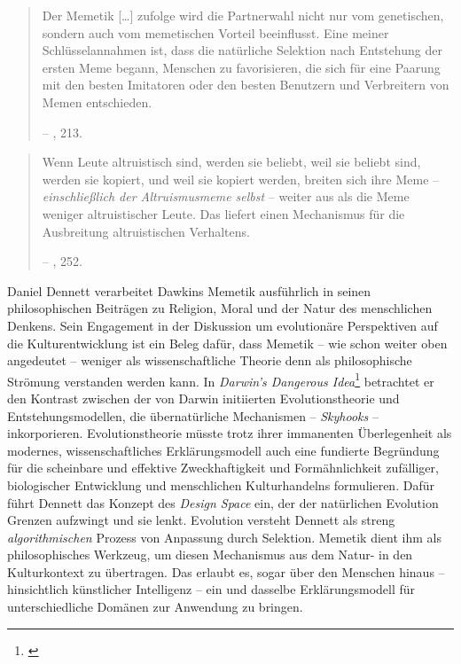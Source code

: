 \documentclass[openany,twoside,twocolumn]{book}
\let\rmarkdownfootnote\footnote%
\def\footnote{\protect\rmarkdownfootnote}
\begin{document}
\begin{quote}
Der Memetik {[}\ldots{}{]} zufolge wird die Partnerwahl nicht nur vom genetischen, sondern auch vom memetischen Vorteil beeinflusst. Eine meiner Schlüsselannahmen ist, dass die natürliche Selektion nach Entstehung der ersten Meme begann, Menschen zu favorisieren, die sich für eine Paarung mit den besten Imitatoren oder den besten Benutzern und Verbreitern von Memen entschieden.

-- \textcite{blackmore_macht_2000}, 213.
\end{quote}

\begin{quote}
Wenn Leute altruistisch sind, werden sie beliebt, weil sie beliebt sind, werden sie kopiert, und weil sie kopiert werden, breiten sich ihre Meme -- \emph{einschließlich der Altruismusmeme selbst} -- weiter aus als die Meme weniger altruistischer Leute. Das liefert einen Mechanismus für die Ausbreitung altruistischen Verhaltens.

-- \textcite{blackmore_macht_2000}, 252.
\end{quote}

Daniel Dennett verarbeitet Dawkins Memetik ausführlich in seinen philosophischen Beiträgen zu Religion, Moral und der Natur des menschlichen Denkens. Sein Engagement in der Diskussion um evolutionäre Perspektiven auf die Kulturentwicklung ist ein Beleg dafür, dass Memetik -- wie schon weiter oben angedeutet -- weniger als wissenschaftliche Theorie denn als philosophische Strömung verstanden werden kann. In \emph{Darwin's Dangerous Idea}\footnote{\textcite{dennett_darwins_1995}} betrachtet er den Kontrast zwischen der von Darwin initiierten Evolutionstheorie und Entstehungsmodellen, die übernatürliche Mechanismen -- \emph{Skyhooks} -- inkorporieren. Evolutionstheorie müsste trotz ihrer immanenten Überlegenheit als modernes, wissenschaftliches Erklärungsmodell auch eine fundierte Begründung für die scheinbare und effektive Zweckhaftigkeit und Formähnlichkeit zufälliger, biologischer Entwicklung und menschlichen Kulturhandelns formulieren. Dafür führt Dennett das Konzept des \emph{Design Space} ein, der der natürlichen Evolution Grenzen aufzwingt und sie lenkt. Evolution versteht Dennett als streng \emph{algorithmischen} Prozess von Anpassung durch Selektion. Memetik dient ihm als philosophisches Werkzeug, um diesen Mechanismus aus dem Natur- in den Kulturkontext zu übertragen. Das erlaubt es, sogar über den Menschen hinaus -- hinsichtlich künstlicher Intelligenz -- ein und dasselbe Erklärungsmodell für unterschiedliche Domänen zur Anwendung zu bringen.
\end{document}
